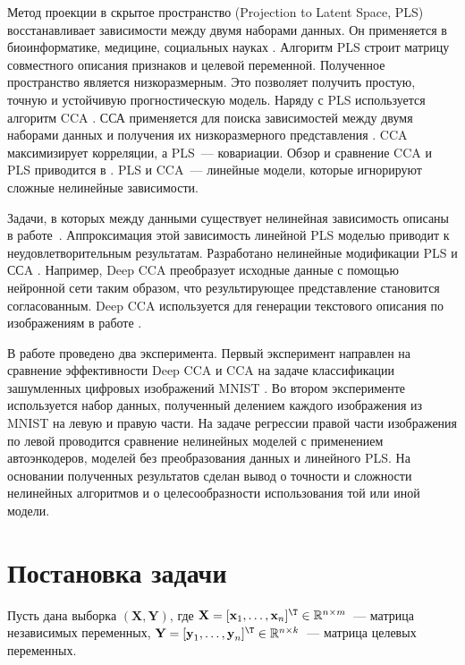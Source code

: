 \documentclass[12pt, twoside]{article}
\newcommand{\bY}{\mathbf{Y}}
\newcommand{\bX}{\mathbf{X}}
\begin{document}
Метод проекции в скрытое пространство (Projection to Latent Space, PLS) \cite{overview_pls, overview_nonlinear_pls} восстанавливает зависимости между двумя наборами данных. Он применяется в биоинформатике, медицине, социальных науках \cite{1figures, btc519, PLS_in_strategic_management, PLS_application}. Алгоритм PLS строит матрицу совместного описания признаков и целевой переменной. Полученное пространство является низкоразмерным. Это позволяет получить простую, точную и устойчивую прогностическую модель. Наряду с PLS используется алгоритм CCA \cite{cca_alg}. ССА применяется для поиска зависимостей между двумя наборами данных и получения их низкоразмерного представления \cite{cca_apl1, cca_apl2}. CCA максимизирует корреляции, а PLS~--- ковариации. Обзор и сравнение CCA и PLS приводится в \cite{overview_pls}. PLS и CCA~--- линейные модели, которые игнорируют сложные нелинейные зависимости. 

Задачи, в которых между данными существует нелинейная зависимость описаны в работе~\cite{?}. Аппроксимация этой зависимость линейной PLS моделью приводит к неудовлетворительным результатам. Разработано нелинейные модификации PLS \cite{PLS_nn, PLS_rbf, PLS_ga} и ССA \cite{deep_cca, kernel_cca}. Например, Deep CCA \cite{deep_cca} преобразует исходные данные с помощью нейронной сети таким образом, что результирующее представление становится согласованным. Deep CCA используется для генерации текстового описания по изображениям в работе \cite{kernel_cca_appl}. 


В работе проведено два эксперимента. Первый эксперимент направлен на сравнение эффективности Deep CCA и CCA на задаче классификации зашумленных цифровых изображений MNIST \cite{MNIST}. Во втором эксперименте используется набор данных, полученный делением каждого изображения из MNIST на левую и правую части. На задаче регрессии правой части изображения по левой проводится сравнение нелинейных моделей с применением автоэнкодеров, моделей без преобразования данных и линейного PLS. На основании полученных результатов сделан вывод о точности и сложности нелинейных алгоритмов и о целесообразности использования той или иной модели.

\section{Постановка задачи}

Пусть дана выборка $(\bX, \bY)$, где $\textbf{X} = [\textbf{x}_1, \dots, \textbf{x}_{n}]^{\T} \in \mathbb{R}^{n \times m}$~--- матрица независимых переменных, $\textbf{Y} = [\textbf{y}_1, \dots, \textbf{y}_n]^{\T} \in \mathbb{R}^{n \times k}$~--- матрица целевых переменных.
\end{document}
